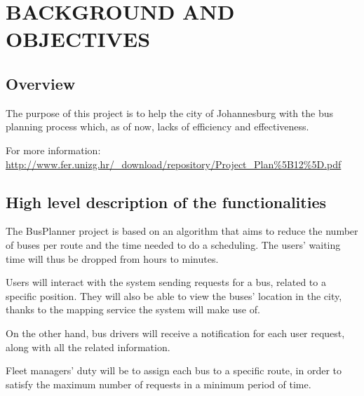 \section{BACKGROUND AND OBJECTIVES}
\subsection{Overview} 
The purpose of this project is to help the city of Johannesburg with the bus planning process which, as of now, lacks of efficiency and effectiveness. 

For more information: \url{http://www.fer.unizg.hr/_download/repository/Project_Plan\%5B12\%5D.pdf}

\subsection{High level description of the functionalities}
The BusPlanner project is based on an algorithm that aims to reduce the number of buses per route and the time needed to do a scheduling. The users' waiting time will thus be dropped from hours to minutes. 

Users will interact with the system sending requests for a bus, related to a specific position. They will also be able to view the buses' location in the city, thanks to the mapping service the system will make use of. 

On the other hand, bus drivers will receive a notification for each user request, along with all the related information. 

Fleet managers' duty will be to assign each bus to a specific route, in order to satisfy the maximum number of requests in a minimum period of time.